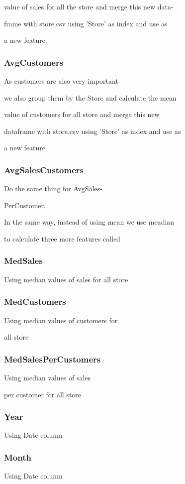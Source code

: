 \documentclass[letterpaper, 10 pt, conference]{ieeeconf}  %
\begin{document}
value of sales for all the store and merge this new
data-

frame with store.csv using 'Store' as index and use as 

a new feature.

\subsubsection{\textbf{AvgCustomers}}

As customers are also very important 

we also group them
by the Store and calculate the mean 

value of customers for all store and merge this new 

dataframe with store.csv using 'Store' as index and use as 

a new feature.

\subsubsection{\textbf{AvgSalesCustomers}}

Do the same thing for AvgSales-

PerCustomer.

In the same way, instead of using mean we use meadian 

to calculate three more features called

\subsubsection{\textbf{MedSales}} Using median values of sales for all store
\subsubsection{\textbf{MedCustomers}} Using median values of customers for 

all store
\subsubsection{\textbf{MedSalesPerCustomers}} Using median values of sales 

per customer for all store

\subsubsection{\textbf{Year}} Using Date column
\subsubsection{\textbf{Month}} Using Date column
\end{document}
